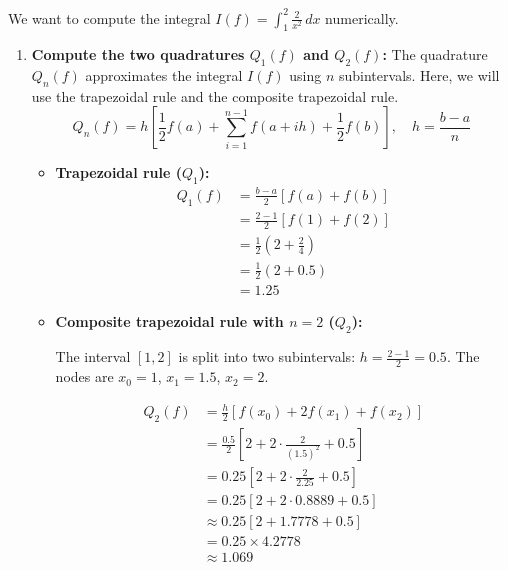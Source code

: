 We want to compute the integral \( I(f) = \int_1^2 \frac{2}{x^2} \, dx \) numerically.

\begin{enumerate}[label=(\alph*)]
    \item \textbf{Compute the two quadratures \( Q_1(f) \) and \( Q_2(f) \):}
          The quadrature \( Q_n(f) \) approximates the integral \( I(f) \) using \( n \) subintervals.
          Here, we will use the trapezoidal rule and the composite trapezoidal rule.
          \[
              Q_n(f) = h \left[ \frac{1}{2}f(a) + \sum_{i=1}^{n-1} f(a + i h) + \frac{1}{2}f(b) \right], \quad h = \frac{b-a}{n}
          \]

          \begin{itemize}
              \item \textbf{Trapezoidal rule (\( Q_1 \)):}
                    \begin{align*}
                        Q_1(f) & = \frac{b-a}{2} \left[ f(a) + f(b) \right] \\
                               & = \frac{2-1}{2} \left[ f(1) + f(2) \right] \\
                               & = \frac{1}{2} \left(2 + \frac{2}{4}\right) \\
                               & = \frac{1}{2} \left(2 + 0.5\right)         \\
                               & = 1.25
                    \end{align*}
              \item \textbf{Composite trapezoidal rule with \( n=2 \) (\( Q_2 \)):}

                    The interval \([1,2]\) is split into two subintervals: \( h = \frac{2-1}{2} = 0.5 \).
                    The nodes are \( x_0 = 1 \), \( x_1 = 1.5 \), \( x_2 = 2 \).

                    \begin{align*}
                        Q_2(f) & = \frac{h}{2} \left[ f(x_0) + 2f(x_1) + f(x_2) \right]           \\
                               & = \frac{0.5}{2} \left[2 + 2 \cdot \frac{2}{(1.5)^2} + 0.5\right] \\
                               & = 0.25 \left[2 + 2 \cdot \frac{2}{2.25} + 0.5\right]             \\
                               & = 0.25 \left[2 + 2 \cdot 0.8889 + 0.5\right]                     \\
                               & \approx 0.25 \left[2 + 1.7778 + 0.5\right]                       \\
                               & = 0.25 \times 4.2778                                             \\
                               & \approx 1.069
                    \end{align*}
          \end{itemize}


\end{enumerate}
